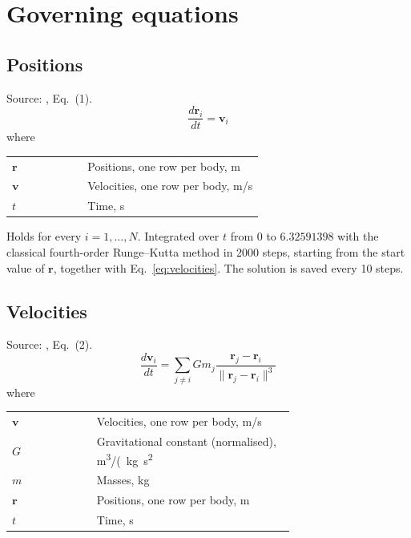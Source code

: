 \section{Governing equations}

\subsection{Positions}
Source: \cite{ref}, Eq.~(1).
\begin{equation}
  \frac{d\mathbf{r}_i}{dt} = \mathbf{v}_i
  \label{eq:positions}
\end{equation}
\noindent where

\noindent\begin{tabular}{@{\quad}l@{\quad}p{0.7\linewidth}@{}}
  $\mathbf{r}$ & Positions, one row per body, \si{m} \\
  $\mathbf{v}$ & Velocities, one row per body, \si{m/s} \\
  $t$ & Time, \si{s} \\
\end{tabular}

\noindent Holds for every $i = 1, \dots, N$. Integrated over $t$ from $0$ to $6.32591398$ with the classical fourth-order Runge–Kutta method in 2000 steps, starting from the start value of $\mathbf{r}$, together with Eq.~\eqref{eq:velocities}. The solution is saved every 10 steps.

\subsection{Velocities}
Source: \cite{ref}, Eq.~(2).
\begin{equation}
  \frac{d\mathbf{v}_i}{dt} = \sum_{j \ne i} G m_j \frac{\mathbf{r}_j - \mathbf{r}_i}{\|\mathbf{r}_j - \mathbf{r}_i\|^3}
  \label{eq:velocities}
\end{equation}
\noindent where

\noindent\begin{tabular}{@{\quad}l@{\quad}p{0.7\linewidth}@{}}
  $\mathbf{v}$ & Velocities, one row per body, \si{m/s} \\
  $G$ & Gravitational constant (normalised), \si{m^{3}/(kg.s^{2}} \\
  $m$ & Masses, \si{kg} \\
  $\mathbf{r}$ & Positions, one row per body, \si{m} \\
  $t$ & Time, \si{s} \\
\end{tabular}

